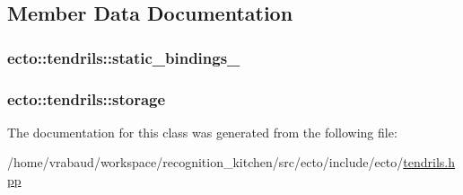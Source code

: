 \subsection{Member Data Documentation}
\subsubsection[{\texorpdfstring{static\+\_\+bindings\+\_\+}{static_bindings_}}]{ ecto\+::tendrils\+::static\+\_\+bindings\+\_\+\hspace{0.3cm}{\ttfamily [private]}}\hypertarget{classecto_1_1tendrils_a40635d009ae082dccde9486c1293212e}{}\label{classecto_1_1tendrils_a40635d009ae082dccde9486c1293212e}
\subsubsection[{\texorpdfstring{storage}{storage}}]{ ecto\+::tendrils\+::storage\hspace{0.3cm}{\ttfamily [private]}}\hypertarget{classecto_1_1tendrils_afaa587298937ffa94ccfefc8a97b4edc}{}\label{classecto_1_1tendrils_afaa587298937ffa94ccfefc8a97b4edc}


The documentation for this class was generated from the following file\+:\begin{DoxyCompactItemize}
\item 
/home/vrabaud/workspace/recognition\+\_\+kitchen/src/ecto/include/ecto/\hyperlink{tendrils_8hpp}{tendrils.\+hpp}\end{DoxyCompactItemize}
